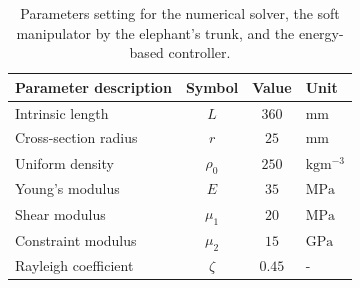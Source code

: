 \clearpage
\begin{table}[t]
\vspace{0.2cm}
\caption{Parameters setting for the numerical solver, the soft manipulator  by the elephant's trunk, and the energy-based controller.}\label{tab:C3:parameters2} \centering
\begin{tabular}{l|c|c|l}
  Parameter description & Symbol    & Value    & Unit                     \\
  \midrule      
  Intrinsic length      & $L $      & $ 360$   & mm                       \\
  Cross-section radius  & $r $      & $ 25$    & $\text{mm}$              \\
  Uniform density       & $\rho_0 $ & $ 250$   & $\text{kg}\text{m}^{-3}$ \\
  Young's modulus       & $E $      & $ 35$    & $\text{MPa}$             \\
  Shear modulus         & $\mu_1 $  & $ 20 $   & $\text{MPa}$             \\
  Constraint modulus    & $\mu_2 $  & $ 15 $   & $\text{GPa}$             \\
  Rayleigh coefficient  & $\zeta $  & $ 0.45 $ & -                        \\
  \bottomrule
\end{tabular}
\end{table}
%